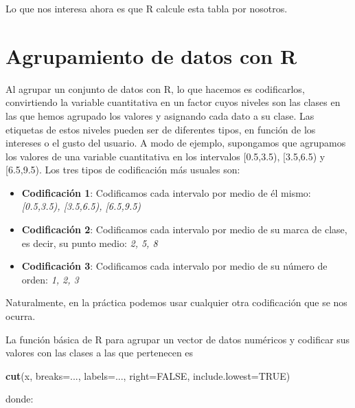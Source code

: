 \documentclass[]{book}
\newenvironment{Shaded}{\begin{snugshade}}{\end{snugshade}}
\newcommand{\DataTypeTok}[1]{\textcolor[rgb]{0.13,0.29,0.53}{#1}}
\newcommand{\KeywordTok}[1]{\textcolor[rgb]{0.13,0.29,0.53}{\textbf{#1}}}
\newcommand{\NormalTok}[1]{#1}
\newcommand{\OtherTok}[1]{\textcolor[rgb]{0.56,0.35,0.01}{#1}}
\providecommand{\tightlist}{%
  \setlength{\itemsep}{0pt}\setlength{\parskip}{0pt}}
\theoremstyle{definition}
\theoremstyle{definition}
\theoremstyle{definition}
\theoremstyle{remark}
\begin{document}
Lo que nos interesa ahora es que R calcule esta tabla por nosotros.

\hypertarget{sec:agrupR}{%
\section{Agrupamiento de datos con R}\label{sec:agrupR}}

Al agrupar un conjunto de datos con R, lo que hacemos es codificarlos,
convirtiendo la variable cuantitativa en un factor cuyos niveles son las clases en las que hemos agrupado los valores y asignando cada dato a su clase. Las etiquetas de estos niveles pueden ser de diferentes tipos, en función de los intereses o el gusto del usuario. A modo de ejemplo, supongamos que agrupamos los valores de una variable cuantitativa en los intervalos
{[}0.5,3.5), {[}3.5,6.5) y {[}6.5,9.5). Los tres tipos de codificación más usuales son:

\begin{itemize}
\tightlist
\item
  \textbf{Codificación 1}: Codificamos cada intervalo por medio de él mismo: \emph{{[}0.5,3.5), {[}3.5,6.5), {[}6.5,9.5)}
\item
  \textbf{Codificación 2}: Codificamos cada intervalo por medio de su marca de clase, es decir, su punto medio: \emph{2, 5, 8}
\item
  \textbf{Codificación 3}: Codificamos cada intervalo por medio de su número de orden: \emph{1, 2, 3}
\end{itemize}

Naturalmente, en la práctica podemos usar cualquier otra codificación que se nos ocurra.

La función básica de R para agrupar un vector de datos numéricos y codificar
sus valores con las clases a las que pertenecen es

\begin{Shaded}
\begin{Highlighting}[]
\KeywordTok{cut}\NormalTok{(x, }\DataTypeTok{breaks=}\NormalTok{..., }\DataTypeTok{labels=}\NormalTok{..., }\DataTypeTok{right=}\OtherTok{FALSE}\NormalTok{, }\DataTypeTok{include.lowest=}\OtherTok{TRUE}\NormalTok{)}
\end{Highlighting}
\end{Shaded}

donde:
\end{document}
